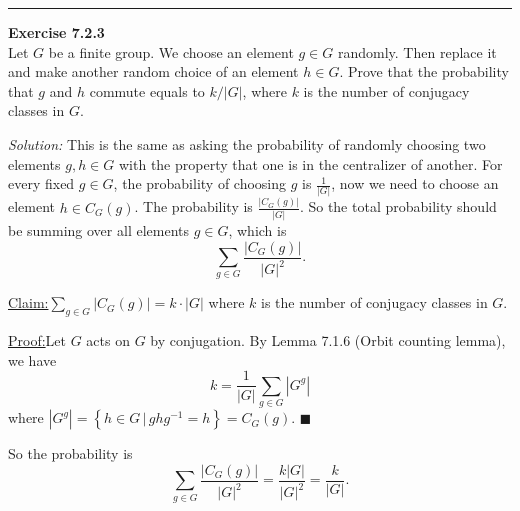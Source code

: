 \documentclass[a4paper, 12pt]{article}
\newenvironment{problem}[2][Exercise]
    { \begin{mdframed}[backgroundcolor=gray!20] \textbf{#1 #2} \\}
    {  \end{mdframed}}
\newenvironment{solution}
    {\textit{Solution:}}
    {}
\newenvironment{claim}[1]{\par\noindent\underline{Claim:}\space#1}{}
\newenvironment{claimproof}[1]{\par\noindent\underline{Proof:}\space#1}{\hfill $\blacksquare$}
\begin{document}
\noindent\rule{7in}{2.8pt}
\begin{problem}{7.2.3}
Let \(G\) be a finite group. We choose an element \(g\in G\) randomly. Then replace it and make another random choice of an element \(h\in G\). Prove that the probability that \(g\) and \(h\) commute equals to \(k/|G|\), 
where \(k\) is the number of conjugacy classes in \(G\).
\end{problem}
\begin{solution}
This is the same as asking the probability of  randomly choosing two elements \(g,h\in G\) with the property that one is in the centralizer of another. For every fixed \(g\in G\), the probability of choosing \(g\) is \(\frac{1}{|G|}\), now we need to choose an element \(h\in C_G(g)\). The probability is 
\(\frac{|C_G(g)|}{|G|}\). So the total probability should be summing over all elements \(g\in G\), which is 
\[\sum_{g\in G}\dfrac{|C_G(g)|}{|G|^2}.\]
\begin{claim}
\(\sum_{g\in G}|C_G(g)|=k\cdot |G|\) where \(k\) is the number of conjugacy classes in \(G\).
\end{claim}  
\begin{claimproof}
Let \(G\) acts on \(G\) by conjugation. By Lemma 7.1.6 (Orbit counting lemma), we have 
\[k=\frac{1}{|G|}\sum_{g\in G}|G^g|\]
where \(|G^g|=\left\{ h\in G\,|\, ghg^{-1}=h \right\}=C_G(g)\).
\end{claimproof}

So the probability is 
\[\sum_{g\in G}\dfrac{|C_G(g)|}{|G|^2}=\dfrac{k|G|}{|G|^2}=\dfrac{k}{|G|}.\]
\end{solution}
\end{document}
